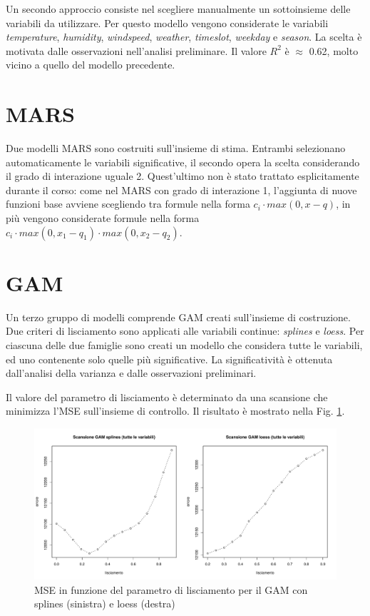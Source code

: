 \documentclass[a4paper, 10pt]{report}
\begin{document}
Un secondo approccio consiste nel scegliere manualmente un sottoinsieme
delle variabili da utilizzare. Per questo modello vengono considerate le
variabili \emph{temperature}, \emph{humidity}, \emph{windspeed}, \emph{weather},
\emph{timeslot}, \emph{weekday} e \emph{season}. La scelta è motivata
dalle osservazioni nell'analisi preliminare. Il valore $R^{2}$ è
$\approx$ 0.62, molto vicino a quello del modello precedente.


\section{MARS}
Due modelli MARS sono costruiti sull'insieme di stima. Entrambi selezionano
automaticamente le variabili significative, il secondo opera la scelta
considerando il grado di interazione uguale 2. Quest'ultimo non è stato
trattato esplicitamente durante il corso: come nel MARS con grado di
interazione 1, l'aggiunta di nuove funzioni base avviene scegliendo tra
formule nella forma $c_i \cdot max(0, x - q)$, in più vengono considerate
formule nella forma $c_i \cdot max(0, x_1 - q_1) \cdot max(0, x_2 - q_2)$.


\section{GAM}
Un terzo gruppo di modelli comprende GAM creati sull'insieme di costruzione.
Due criteri di lisciamento sono applicati alle variabili continue:
\emph{splines} e \emph{loess}. Per ciascuna delle due famiglie sono
creati un modello che considera tutte le variabili, ed uno contenente
solo quelle più significative. La significatività è ottenuta dall'analisi
della varianza e dalle osservazioni preliminari.

Il valore del parametro di lisciamento è determinato da una scansione
che minimizza l'MSE sull'insieme di controllo. Il risultato è mostrato
nella Fig. \ref{fig:GAM}.

\begin{figure}
  \includegraphics[width=1.0\textwidth]{../plots/GAM.pdf}
  \caption{MSE in funzione del parametro di lisciamento per il GAM con splines (sinistra) e loess (destra)}
  \label{fig:GAM}
\end{figure}
\end{document}
